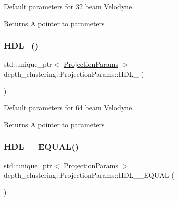 Default parameters for 32 beam Velodyne. 

\begin{DoxyReturn}{Returns}
A pointer to parameters 
\end{DoxyReturn}
\mbox{\label{classdepth__clustering_1_1ProjectionParams_a40b8a22533ec69811ef4d3d01fb04a85}} 
\subsubsection{\texorpdfstring{H\+D\+L\+\_()}{HDL\_64()}}
{\footnotesize\ttfamily std\+::unique\+\_\+ptr$<$ \hyperlink{classdepth__clustering_1_1ProjectionParams}{Projection\+Params} $>$ depth\+\_\+clustering\+::\+Projection\+Params\+::\+H\+D\+L\+\_ (\begin{DoxyParamCaption}{ }\end{DoxyParamCaption})\hspace{0.3cm}{\ttfamily [static]}}



Default parameters for 64 beam Velodyne. 

\begin{DoxyReturn}{Returns}
A pointer to parameters 
\end{DoxyReturn}
\mbox{\label{classdepth__clustering_1_1ProjectionParams_a22a7d186bd32c86262e94843331230a1}} 
\subsubsection{\texorpdfstring{H\+D\+L\+\_\+\_\+\+E\+Q\+U\+A\+L()}{HDL\_64\_EQUAL()}}
{\footnotesize\ttfamily std\+::unique\+\_\+ptr$<$ \hyperlink{classdepth__clustering_1_1ProjectionParams}{Projection\+Params} $>$ depth\+\_\+clustering\+::\+Projection\+Params\+::\+H\+D\+L\+\_\+\_\+\+E\+Q\+U\+AL (\begin{DoxyParamCaption}{ }\end{DoxyParamCaption})\hspace{0.3cm}{\ttfamily [static]}}



